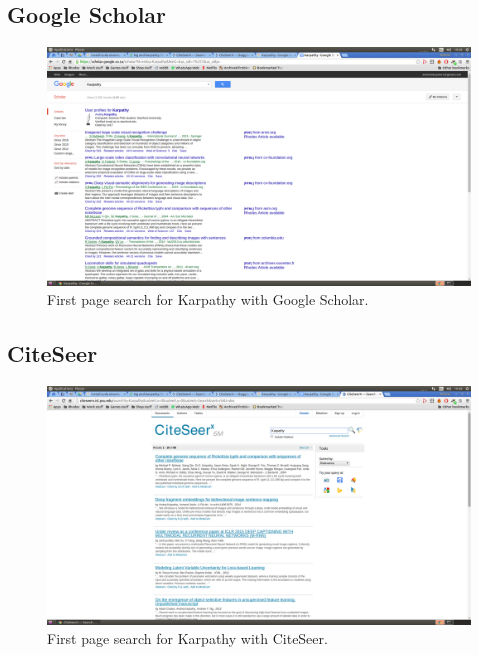 \documentclass[a4paper]{article}
\begin{document}
\subsection{Google Scholar}
\begin{figure}[H]
\centering
\includegraphics[width=1.0\textwidth]{kp-scholar.png}
\caption{\label{fig:kps}First page search for Karpathy with Google Scholar.}
\end{figure}

\subsection{CiteSeer}
\begin{figure}[H]
\centering
\includegraphics[width=1.0\textwidth]{kp-citeseer.png}
\caption{\label{fig:kpc}First page search for Karpathy with CiteSeer.}
\end{figure}
\end{document}
